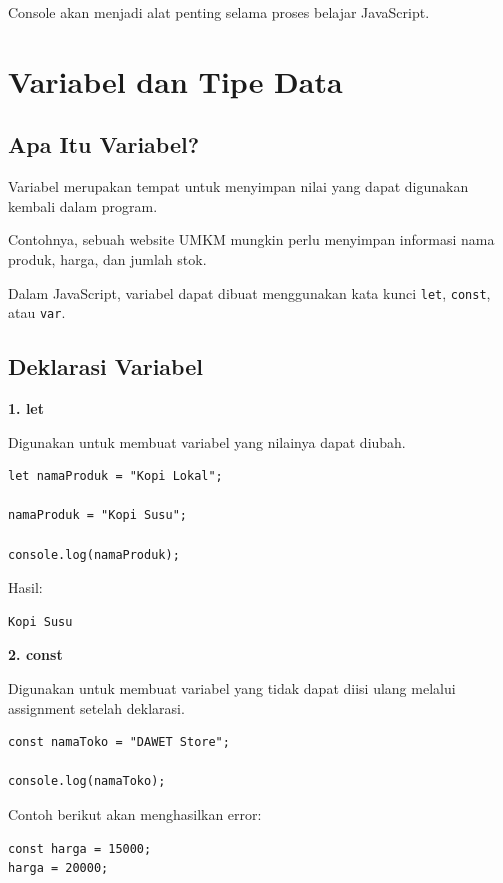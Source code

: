 \documentclass[12pt,a4paper]{article}
\begin{document}
Console akan menjadi alat penting selama proses
belajar JavaScript.

\section{Variabel dan Tipe Data}

\subsection{Apa Itu Variabel?}

Variabel merupakan tempat untuk menyimpan nilai
yang dapat digunakan kembali dalam program.

Contohnya, sebuah website UMKM mungkin perlu
menyimpan informasi nama produk, harga, dan jumlah
stok.

Dalam JavaScript, variabel dapat dibuat menggunakan
kata kunci \texttt{let}, \texttt{const}, atau
\texttt{var}.

\subsection{Deklarasi Variabel}

\textbf{1. let}

Digunakan untuk membuat variabel yang nilainya
dapat diubah.

\begin{lstlisting}
let namaProduk = "Kopi Lokal";

namaProduk = "Kopi Susu";

console.log(namaProduk);
\end{lstlisting}

Hasil:

\begin{lstlisting}
Kopi Susu
\end{lstlisting}

\textbf{2. const}

Digunakan untuk membuat variabel yang tidak dapat
diisi ulang melalui assignment setelah deklarasi.

\begin{lstlisting}
const namaToko = "DAWET Store";

console.log(namaToko);
\end{lstlisting}

Contoh berikut akan menghasilkan error:

\begin{lstlisting}
const harga = 15000;
harga = 20000;
\end{lstlisting}
\end{document}
